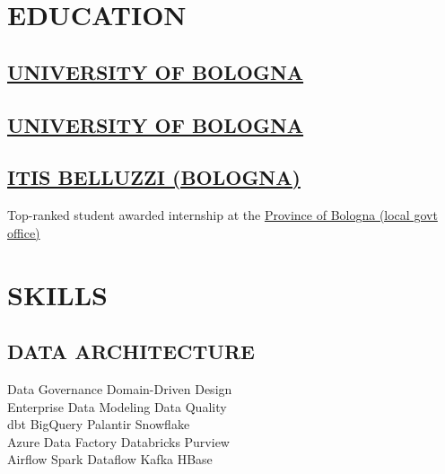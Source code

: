 \documentclass[]{deedy-resume-cv}
\begin{document}
\hfill
\begin{minipage}[t]{0.35\textwidth}

\section{EDUCATION}

\subsection{\href{https://www.unibo.it/}{UNIVERSITY OF BOLOGNA}}

\sectionsep
\subsection{\href{https://www.unibo.it/}{UNIVERSITY OF BOLOGNA}}

\sectionsep
\subsection{\href{https://www.belluzzifioravanti.it/}{ITIS BELLUZZI (BOLOGNA)}}
Top-ranked student awarded internship at the \href{https://www.cittametropolitana.bo.it/}{Province of Bologna (local govt office)}

\section{SKILLS}

\subsection{DATA ARCHITECTURE}
Data Governance \textbullet{} Domain-Driven Design \\ 
Enterprise Data Modeling \textbullet{}  Data Quality  \\
dbt \textbullet{} BigQuery \textbullet{} Palantir \textbullet{} Snowflake \\
Azure Data Factory \textbullet{} Databricks \textbullet{} Purview \\
Airflow \textbullet{} Spark \textbullet{} Dataflow \textbullet{} Kafka \textbullet{} HBase


\end{minipage}
\end{document}
